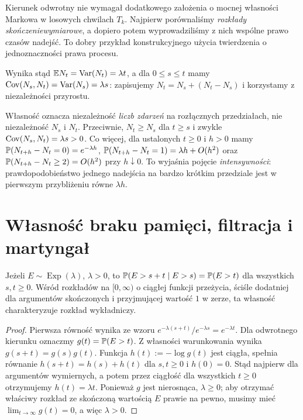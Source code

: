 \begin{uwaga}
Kierunek odwrotny nie wymagał dodatkowego założenia o
mocnej własności Markowa w losowych chwilach $T_k$.
Najpierw porównaliśmy \emph{rozkłady skończeniewymiarowe},
a dopiero potem wyprowadziliśmy z nich wspólne prawo
czasów nadejść. To dobry przykład konstrukcyjnego
użycia twierdzenia o jednoznaczności prawa procesu.
\end{uwaga}

Wynika stąd $\mathbb{E} N_t=\operatorname{Var}(N_t)=\lambda t$,
a dla $0\le s\le t$ mamy
$\operatorname{Cov}(N_s,N_t)=\operatorname{Var}(N_s)=\lambda s$: zapisujemy
$N_t=N_s+(N_t-N_s)$ i korzystamy z niezależności przyrostu.

\begin{uwaga}
Własność oznacza niezależność \emph{liczb zdarzeń} na rozłącznych
przedziałach, nie niezależność $N_s$ i $N_t$. Przeciwnie,
$N_t\ge N_s$ dla $t\ge s$ i zwykle
$\operatorname{Cov}(N_s,N_t)=\lambda s>0$. Co więcej, dla ustalonych
$t\ge0$ i $h>0$ mamy
$\mathbb{P}(N_{t+h}-N_t=0)=e^{-\lambda h}$,
$\mathbb{P}(N_{t+h}-N_t=1)=\lambda h+O(h^2)$
oraz $\mathbb{P}(N_{t+h}-N_t\ge2)=O(h^2)$ przy $h\downarrow0$.
To wyjaśnia pojęcie \emph{intensywności}: prawdopodobieństwo
jednego nadejścia na bardzo krótkim przedziale jest w pierwszym
przybliżeniu równe $\lambda h$.
\end{uwaga}

\section{Własność braku pamięci, filtracja i martyngał}
\begin{stwierdzenie}
Jeżeli $E\sim\operatorname{Exp}(\lambda)$, $\lambda>0$, to
$\mathbb{P}(E>s+t\mid E>s)=\mathbb{P}(E>t)$ dla wszystkich $s,t\ge0$.
Wśród rozkładów na $[0,\infty)$ o ciągłej funkcji przeżycia,
ściśle dodatniej dla argumentów skończonych i przyjmującej wartość
$1$ w zerze, ta własność charakteryzuje rozkład wykładniczy.
\end{stwierdzenie}
\begin{proof}
Pierwsza równość wynika ze wzoru
$e^{-\lambda(s+t)}/e^{-\lambda s}=e^{-\lambda t}$.
Dla odwrotnego kierunku oznaczmy $g(t)=\mathbb{P}(E>t)$.
Z własności warunkowania wynika $g(s+t)=g(s)g(t)$.
Funkcja $h(t):=-\log g(t)$ jest ciągła, spełnia równanie
$h(s+t)=h(s)+h(t)$ dla $s,t\ge0$ i $h(0)=0$.
Stąd najpierw dla argumentów wymiernych, a potem przez ciągłość
dla wszystkich $t\ge0$ otrzymujemy $h(t)=\lambda t$.
Ponieważ $g$ jest nierosnąca, $\lambda\ge0$; aby otrzymać
właściwy rozkład ze skończoną wartością $E$ prawie na pewno,
musimy mieć $\lim_{t\to\infty}g(t)=0$, a więc $\lambda>0$.
\end{proof}

